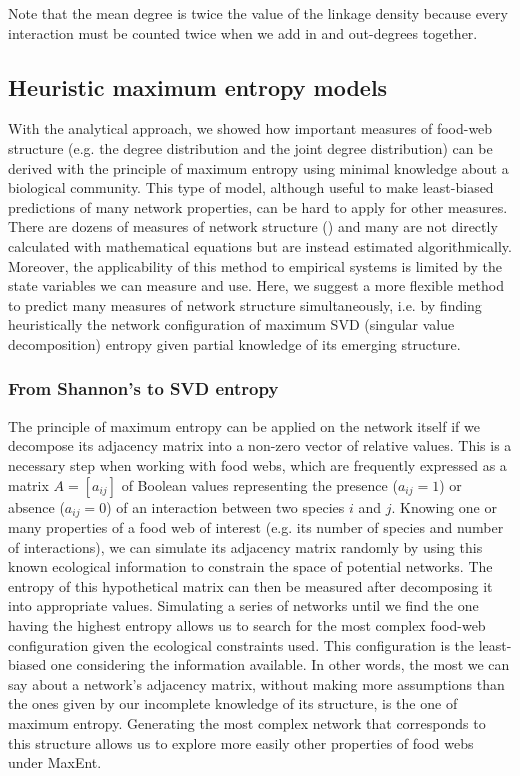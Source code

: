Note that the mean degree is twice the value of the linkage density because
every interaction must be counted twice when we add in and out-degrees together. 

\subsection{Heuristic maximum entropy models} 

With the analytical approach, we showed how important measures of food-web
structure (e.g. the degree distribution and the joint degree distribution) can
be derived with the principle of maximum entropy using minimal knowledge about a
biological community. This type of model, although useful to make least-biased
predictions of many network properties, can be hard to apply for other measures.
There are dozens of measures of network structure (\cite{Delmas2019Analysing}) and
many are not directly calculated with mathematical equations but are instead
estimated algorithmically. Moreover, the applicability of this method to
empirical systems is limited by the state variables we can measure and use.
Here, we suggest a more flexible method to predict many measures of network
structure simultaneously, i.e. by finding heuristically the network
configuration of maximum SVD (singular value decomposition) entropy given
partial knowledge of its emerging structure. 

\subsubsection{From Shannon's to SVD entropy}

The principle of maximum entropy can be applied on the network itself if we
decompose its adjacency matrix into a non-zero vector of relative values. This
is a necessary step when working with food webs, which are frequently expressed
as a matrix $A = [a_{ij}]$ of Boolean values representing the presence ($a_{ij}
= 1$) or absence ($a_{ij} = 0$) of an interaction between two species $i$ and
$j$. Knowing one or many properties of a food web of interest (e.g. its number
of species and number of interactions), we can simulate its adjacency matrix
randomly by using this known ecological information to constrain the space of
potential networks. The entropy of this hypothetical matrix can then be measured
after decomposing it into appropriate values. Simulating a series of networks
until we find the one having the highest entropy allows us to search for the
most complex food-web configuration given the ecological constraints used. This
configuration is the least-biased one considering the information available. In
other words, the most we can say about a network's adjacency matrix, without
making more assumptions than the ones given by our incomplete knowledge of its
structure, is the one of maximum entropy. Generating the most complex network
that corresponds to this structure allows us to explore more easily other
properties of food webs under MaxEnt. 

